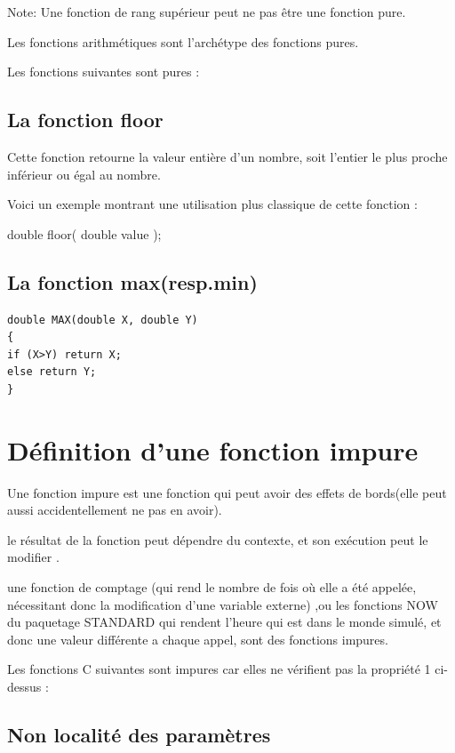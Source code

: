 \documentclass[12pt,titlepage]{article}
\begin{document}
Note: Une fonction de rang supérieur peut ne pas être une fonction pure.


Les fonctions arithmétiques sont l'archétype des fonctions pures.

Les fonctions  suivantes sont pures :


\subsection{La fonction floor}

Cette fonction retourne la valeur entière d'un nombre, soit l'entier le plus proche inférieur ou égal au nombre.

Voici un exemple montrant une utilisation plus classique de cette fonction :

double      floor( double value );


\subsection{La fonction max(resp.min)}

\begin{lstlisting}
double MAX(double X, double Y)
{
if (X>Y) return X;
else return Y;
}
\end{lstlisting}

\section{Définition d’une fonction impure}

Une fonction impure est une fonction qui peut avoir des effets de bords(elle peut aussi accidentellement ne pas en avoir).

le résultat de la fonction peut dépendre du contexte, et son exécution peut le modifier .

une fonction de comptage (qui rend le nombre de fois où elle a été appelée, nécessitant donc la modification d’une variable externe) ,ou les fonctions NOW du paquetage STANDARD qui rendent l’heure qui est dans le monde simulé, et donc une valeur différente a chaque appel, sont des  fonctions impures.

Les fonctions C suivantes sont impures car elles ne vérifient pas la propriété 1 ci-dessus :

\subsection{Non localité des paramètres}
\end{document}
